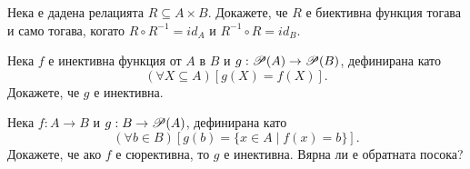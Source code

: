 

\begin{problem}
  Нека е дадена релацията $R\subseteq A\times B$.
  Докажете, че $R$ е биективна функция тогава и само тогава, когато $R\circ R^{-1} = id_A$ и $R^{-1}\circ R = id_B$.
\end{problem}

\begin{problem}
  Нека $f$ е инективна функция от $A$ в $B$ и $g:\mathscr{P}(A) \rightarrow \mathscr{P}(B)$, дефинирана като 
  \[(\forall X \subseteq A)[g(X) = f(X)].\]
  Докажете, че $g$ е инективна.
\end{problem}

\begin{problem}
  Нека $f:A\rightarrow B$ и $g:B\rightarrow\mathscr{P}(A)$, дефинирана като 
  \[(\forall b \in B)[g(b) = \{x\in A\mid f(x) = b\}].\]
  Докажете, че ако $f$ е сюрективна, то $g$ е инективна.
  Вярна ли е обратната посока?
\end{problem}

\cite{hein}

